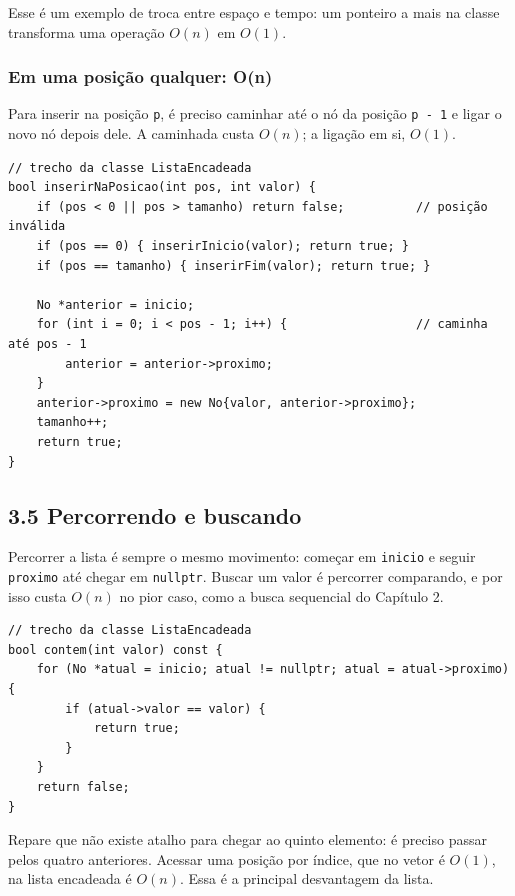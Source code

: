 Esse é um exemplo de troca entre espaço e tempo: um ponteiro a mais na classe transforma uma operação $O(n)$ em $O(1)$.

\subsubsection{Em uma posição qualquer: O(n)}

Para inserir na posição \texttt{p}, é preciso caminhar até o nó da posição \texttt{p - 1} e ligar o novo nó depois dele. A caminhada custa $O(n)$; a ligação em si, $O(1)$.

\begin{codigo}
\begin{Verbatim}[breaklines=true, breaksymbolleft={}, fontsize=\footnotesize]
// trecho da classe ListaEncadeada
bool inserirNaPosicao(int pos, int valor) {
    if (pos < 0 || pos > tamanho) return false;          // posição inválida
    if (pos == 0) { inserirInicio(valor); return true; }
    if (pos == tamanho) { inserirFim(valor); return true; }

    No *anterior = inicio;
    for (int i = 0; i < pos - 1; i++) {                  // caminha até pos - 1
        anterior = anterior->proximo;
    }
    anterior->proximo = new No{valor, anterior->proximo};
    tamanho++;
    return true;
}
\end{Verbatim}
\end{codigo}

\subsection{3.5 Percorrendo e buscando}

Percorrer a lista é sempre o mesmo movimento: começar em \texttt{inicio} e seguir \texttt{proximo} até chegar em \texttt{nullptr}. Buscar um valor é percorrer comparando, e por isso custa $O(n)$ no pior caso, como a busca sequencial do Capítulo 2.

\begin{codigo}
\begin{Verbatim}[breaklines=true, breaksymbolleft={}, fontsize=\footnotesize]
// trecho da classe ListaEncadeada
bool contem(int valor) const {
    for (No *atual = inicio; atual != nullptr; atual = atual->proximo) {
        if (atual->valor == valor) {
            return true;
        }
    }
    return false;
}
\end{Verbatim}
\end{codigo}

Repare que não existe atalho para chegar ao quinto elemento: é preciso passar pelos quatro anteriores. Acessar uma posição por índice, que no vetor é $O(1)$, na lista encadeada é $O(n)$. Essa é a principal desvantagem da lista.

